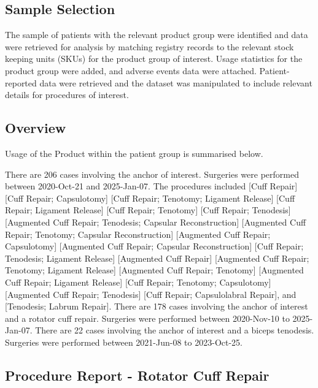 \documentclass[
]{article}
\begin{document}
\subsection{Sample Selection}\label{sample-selection}

The sample of patients with the relevant product group were identified
and data were retrieved for analysis by matching registry records to the
relevant stock keeping units (SKUs) for the product group of interest.
Usage statistics for the product group were added, and adverse events
data were attached. Patient-reported data were retrieved and the dataset
was manipulated to include relevant details for procedures of interest.

\subsection{Overview}\label{overview}

Usage of the Product within the patient group is summarised below.

There are 206 cases involving the anchor of interest. Surgeries were
performed between 2020-Oct-21 and 2025-Jan-07. The procedures included
{[}Cuff Repair{]} {[}Cuff Repair; Capsulotomy{]} {[}Cuff Repair;
Tenotomy; Ligament Release{]} {[}Cuff Repair; Ligament Release{]}
{[}Cuff Repair; Tenotomy{]} {[}Cuff Repair; Tenodesis{]} {[}Augmented
Cuff Repair; Tenodesis; Capsular Reconstruction{]} {[}Augmented Cuff
Repair; Tenotomy; Capsular Reconstruction{]} {[}Augmented Cuff Repair;
Capsulotomy{]} {[}Augmented Cuff Repair; Capsular Reconstruction{]}
{[}Cuff Repair; Tenodesis; Ligament Release{]} {[}Augmented Cuff
Repair{]} {[}Augmented Cuff Repair; Tenotomy; Ligament Release{]}
{[}Augmented Cuff Repair; Tenotomy{]} {[}Augmented Cuff Repair; Ligament
Release{]} {[}Cuff Repair; Tenotomy; Capsulotomy{]} {[}Augmented Cuff
Repair; Tenodesis{]} {[}Cuff Repair; Capsulolabral Repair{]}, and
{[}Tenodesis; Labrum Repair{]}. There are 178 cases involving the anchor
of interest and a rotator cuff repair. Surgeries were performed between
2020-Nov-10 to 2025-Jan-07. There are 22 cases involving the anchor of
interest and a biceps tenodesis. Surgeries were performed between
2021-Jun-08 to 2023-Oct-25.

\subsection{Procedure Report - Rotator Cuff
Repair}\label{procedure-report---rotator-cuff-repair}
\end{document}
